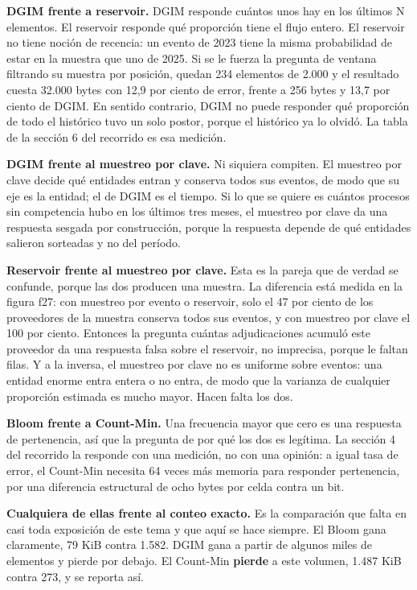 \documentclass[11pt]{article}
\begin{document}
\textbf{DGIM frente a reservoir.} DGIM responde cuántos unos hay en los últimos N elementos. El reservoir responde qué proporción tiene el flujo entero. El reservoir no tiene noción de recencia: un evento de 2023 tiene la misma probabilidad de estar en la muestra que uno de 2025. Si se le fuerza la pregunta de ventana filtrando su muestra por posición, quedan 234 elementos de 2.000 y el resultado cuesta 32.000 bytes con 12,9 por ciento de error, frente a 256 bytes y 13,7 por ciento de DGIM. En sentido contrario, DGIM no puede responder qué proporción de todo el histórico tuvo un solo postor, porque el histórico ya lo olvidó. La tabla de la sección 6 del recorrido es esa medición.

\textbf{DGIM frente al muestreo por clave.} Ni siquiera compiten. El muestreo por clave decide qué entidades entran y conserva todos sus eventos, de modo que su eje es la entidad; el de DGIM es el tiempo. Si lo que se quiere es cuántos procesos sin competencia hubo en los últimos tres meses, el muestreo por clave da una respuesta sesgada por construcción, porque la respuesta depende de qué entidades salieron sorteadas y no del período.

\textbf{Reservoir frente al muestreo por clave.} Esta es la pareja que de verdad se confunde, porque las dos producen una muestra. La diferencia está medida en la figura f27: con muestreo por evento o reservoir, solo el 47 por ciento de los proveedores de la muestra conserva todos sus eventos, y con muestreo por clave el 100 por ciento. Entonces la pregunta cuántas adjudicaciones acumuló este proveedor da una respuesta falsa sobre el reservoir, no imprecisa, porque le faltan filas. Y a la inversa, el muestreo por clave no es uniforme sobre eventos: una entidad enorme entra entera o no entra, de modo que la varianza de cualquier proporción estimada es mucho mayor. Hacen falta los dos.

\textbf{Bloom frente a Count-Min.} Una frecuencia mayor que cero es una respuesta de pertenencia, así que la pregunta de por qué los dos es legítima. La sección 4 del recorrido la responde con una medición, no con una opinión: a igual tasa de error, el Count-Min necesita 64 veces más memoria para responder pertenencia, por una diferencia estructural de ocho bytes por celda contra un bit.

\textbf{Cualquiera de ellas frente al conteo exacto.} Es la comparación que falta en casi toda exposición de este tema y que aquí se hace siempre. El Bloom gana claramente, 79 KiB contra 1.582. DGIM gana a partir de algunos miles de elementos y pierde por debajo. El Count-Min \textbf{pierde} a este volumen, 1.487 KiB contra 273, y se reporta así.
\end{document}
